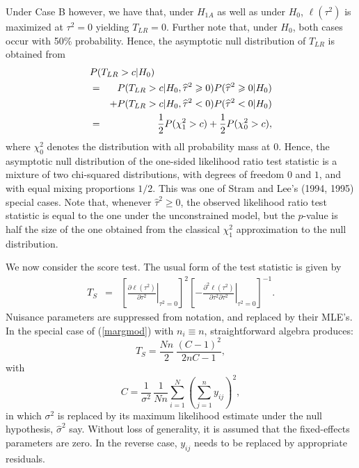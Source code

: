 \documentclass[useAMS,usenatbib,referee]{biom}
\begin{document}
Under Case B however, we have that, under $H_{1A}$ as well as under
$H_{0}$, $\ell(\tau^2)$ is maximized at $\tau^2=0$ yielding
$T_{LR}=0$. Further note that, under $H_0$, both cases occur with 50\%
probability. Hence, the asymptotic null distribution of $T_{LR}$ is
obtained from
\begin{eqnarray*}
\lefteqn{P(T_{LR}> c|H_0)}\\ 
& = &
P(T_{LR}> c|H_0,\widehat\tau^2\ge 0)P(\widehat\tau^2\ge 0|H_0)\\
&&+
P(T_{LR}> c|H_0,\widehat\tau^2< 0)P(\widehat\tau^2< 0|H_0) \\ 
& = & \frac{1}{2} P(\chi^2_1>c) + \frac{1}{2} P(\chi_0^2 > c),
\end{eqnarray*}
where $\chi_0^2$ denotes the distribution with all probability mass at
$0$. Hence, the asymptotic null distribution of the one-sided
likelihood ratio test statistic is a mixture of two chi-squared
distributions, with degrees of freedom $0$ and $1$, and with equal
mixing proportions $1/2$. This was one of Stram and Lee's (1994, 1995)
special cases.  Note that, whenever $\widehat\tau^2 \geq 0$, the
observed likelihood ratio test statistic is equal to the one under the
unconstrained model, but the $p$-value is half the size of the one
obtained from the classical $\chi_1^2$ approximation to the null
distribution.

We now consider the score test. The usual form of the test statistic
is given by
\begin{eqnarray}
T_S & = & \left[\left.\frac{\partial \ell(\tau^2)}{\partial
\tau^2}\right|_{\tau^2=0}\right]^2 \left[\left. - \frac{\partial^2
\ell(\tau^2)}{\partial \tau^2 \partial
\tau^2}\right|_{\tau^2=0}\right]^{-1}.\label{score two sided}
\end{eqnarray}
Nuisance parameters are suppressed from notation, and replaced by
their MLE's.  In the special case of (\ref{margmod}) with $n_i\equiv
n$, straightforward algebra produces:
$$
T_S=\frac{Nn}{2}\,\frac{(C-1)^2}{2nC-1},
$$
with
$$
C=\frac{1}{\sigma^2}\,\frac{1}{Nn}\sum_{i=1}^N\left(
\sum_{j=1}^{n}y_{ij}
\right)^2,
$$ 
in which $\sigma^2$ is replaced by its maximum likelihood estimate
under the null hypothesis, $\widehat{\sigma}^2$ say.  Without loss of
generality, it is assumed that the fixed-effects parameters are
zero. In the reverse case, $y_{ij}$ needs to be replaced by
appropriate residuals.
\end{document}
